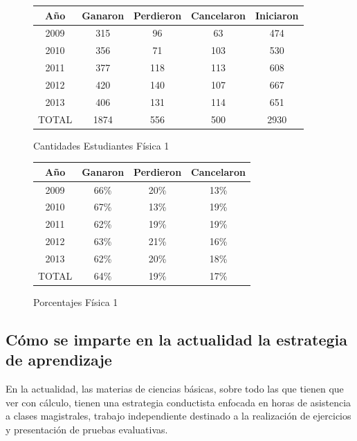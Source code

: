 \documentclass[twoside,letterpaper,11pt]{report}
\begin{document}
\begin{figure}
\begin{center}
\begin{tabular}{|c|c|c|c|c|} \hline
Año 	&	Ganaron		&	Perdieron 	&	Cancelaron 	&	Iniciaron	\\ \hline	\hline
2009	&	315			&	96			&	63			&	474			\\ \hline
2010	&	356			&	71			&	103			&	530			\\ \hline
2011	&	377			&	118			&	113			&	608			\\ \hline
2012	&	420			&	140			&	107			&	667			\\ \hline
2013	&	406			&	131			&	114			&	651			\\ \hline
TOTAL	&	1874		&	556			&	500			&	2930		\\ \hline	
\end{tabular}
\end{center}
\caption{Cantidades Estudiantes Física 1}
\end{figure}

\begin{figure}
\begin{center}
\begin{tabular}{|c|c|c|c|} \hline
Año		&	Ganaron	&	Perdieron	&	Cancelaron	\\ \hline \hline
2009	&	66\%	&	20\%		&	13\%		\\ \hline	
2010	&	67\%	&	13\%		&	19\%		\\ \hline	
2011	&	62\%	&	19\%		&	19\%		\\ \hline	
2012	&	63\%	&	21\%		&	16\%		\\ \hline	
2013	&	62\%	&	20\%		&	18\%		\\ \hline	
TOTAL	&	64\%	&	19\%		&	17\%		\\ \hline	
\end{tabular}
\end{center}
\caption{Porcentajes Física 1}
\end{figure}


\subsection{Cómo se imparte en la actualidad la estrategia de aprendizaje} %
\label{sub:c_mo_se_imparte_en_la_actualidad_la_estrategia_de_aprendizaje}

En la actualidad, las materias de ciencias básicas, sobre todo las que tienen que ver con cálculo, tienen una estrategia conductista enfocada en horas de asistencia a clases magistrales, trabajo independiente destinado a la realización de ejercicios y presentación de pruebas evaluativas.
\end{document}
